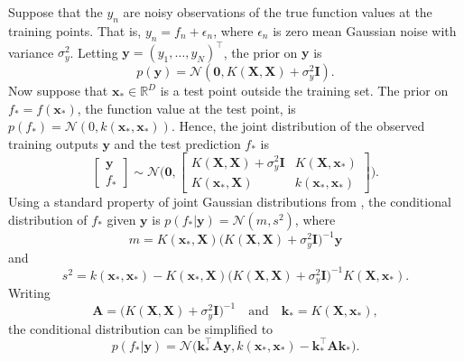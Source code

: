 \documentclass[msc,deptreport.inf]{infthesis} %
\newcommand{\matr}[1]{\mathbf{#1}}
\newcommand{\R}{\mathbb R}
\begin{document}
Suppose that the $y_n$ are noisy observations of the true function values at the training points. That is, $y_n = f_n + \epsilon_n$, where $\epsilon_n$ is zero mean Gaussian noise with variance $\sigma_y^2$. Letting $\matr{y} = (y_1, \dots, y_N)^\intercal$, the prior on $\matr{y}$ is 
\begin{equation}
	p(\matr{y}) = \mathcal{N}(\matr{0}, K(\matr{X}, \matr{X}) + \sigma_y^2 \matr{I}).
\end{equation}
Now suppose that $\matr{x}_{*} \in \R^D$ is a test point outside the training set. The prior on $f_{*} = f(\matr{x}_{*})$, the function value at the test point, is $p(f_{*} ) = \mathcal{N}(0, k(\matr{x}_{*}, \matr{x}_{*}))$. Hence, the joint distribution of the observed training outputs $\matr{y}$ and the test prediction $f_{*}$ is
\begin{equation}
	\begin{bmatrix}
		\matr{y} \\
		f_{*}
	\end{bmatrix}
	\sim \mathcal{N}\Bigg(
		\matr{0}, 
		\begin{bmatrix}
			K(\matr{X}, \matr{X}) + \sigma_y^2 \matr{I} & K(\matr{X}, \matr{x}_{*}) \\
			K(\matr{x}_{*}, \matr{X}) & k(\matr{x}_{*}, \matr{x}_{*})
		\end{bmatrix}
	\Bigg).
\end{equation}
Using a standard property of joint Gaussian distributions from \cite{barber2007}, the conditional distribution of $f_{*}$ given $\matr{y}$ is $p(f_{*} | \matr{y}) = \mathcal{N}(m, s^2)$, where
\begin{equation}
	m = K(\matr{x}_{*}, \matr{X}) \big(K(\matr{X}, \matr{X}) + \sigma_y^2 \matr{I}\big)^{-1} \matr{y}
\end{equation}
and
\begin{equation}
	s^2 = k(\matr{x}_{*}, \matr{x}_{*}) 
	- K(\matr{x}_{*}, \matr{X}) \big(K(\matr{X}, \matr{X}) + \sigma_y^2 \matr{I}\big)^{-1} K(\matr{X}, \matr{x}_{*}).
\end{equation}
Writing
\begin{equation}
	\matr{A} = \big(K(\matr{X}, \matr{X}) + \sigma_y^2 \matr{I}\big)^{-1}
	\quad \text{and} \quad 
	\matr{k}_{*} = K(\matr{X}, \matr{x}_{*}),
\end{equation}
the conditional distribution can be simplified to 
\begin{equation}\label{eqn:gp_prediction}
	p(f_{*} | \matr{y}) = \mathcal{N}\big(
		\matr{k}_{*}^\intercal \matr{A} \matr{y},  
		k(\matr{x}_{*}, \matr{x}_{*}) - \matr{k}_{*}^\intercal \matr{A} \matr{k}_{*}
	\big).
\end{equation} 
\end{document}
